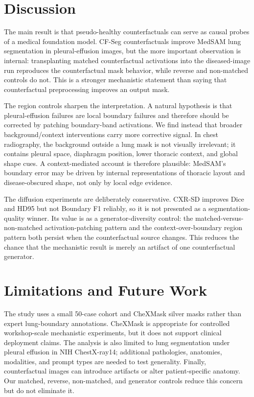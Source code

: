 \documentclass[runningheads]{llncs}
\begin{document}
\section{Discussion}

The main result is that pseudo-healthy counterfactuals can serve as causal probes of a medical foundation model. CF-Seg counterfactuals improve MedSAM lung segmentation in pleural-effusion images, but the more important observation is internal: transplanting matched counterfactual activations into the diseased-image run reproduces the counterfactual mask behavior, while reverse and non-matched controls do not. This is a stronger mechanistic statement than saying that counterfactual preprocessing improves an output mask.

The region controls sharpen the interpretation. A natural hypothesis is that pleural-effusion failures are local boundary failures and therefore should be corrected by patching boundary-band activations. We find instead that broader background/context interventions carry more corrective signal. In chest radiography, the background outside a lung mask is not visually irrelevant; it contains pleural space, diaphragm position, lower thoracic context, and global shape cues. A context-mediated account is therefore plausible: MedSAM's boundary error may be driven by internal representations of thoracic layout and disease-obscured shape, not only by local edge evidence.

The diffusion experiments are deliberately conservative. CXR-SD improves Dice and HD95 but not Boundary F1 reliably, so it is not presented as a segmentation-quality winner. Its value is as a generator-diversity control: the matched-versus-non-matched activation-patching pattern and the context-over-boundary region pattern both persist when the counterfactual source changes. This reduces the chance that the mechanistic result is merely an artifact of one counterfactual generator.

\section{Limitations and Future Work}

The study uses a small 50-case cohort and CheXMask silver masks rather than expert lung-boundary annotations. CheXMask is appropriate for controlled workshop-scale mechanistic experiments, but it does not support clinical deployment claims. The analysis is also limited to lung segmentation under pleural effusion in NIH ChestX-ray14; additional pathologies, anatomies, modalities, and prompt types are needed to test generality. Finally, counterfactual images can introduce artifacts or alter patient-specific anatomy. Our matched, reverse, non-matched, and generator controls reduce this concern but do not eliminate it.
\end{document}

